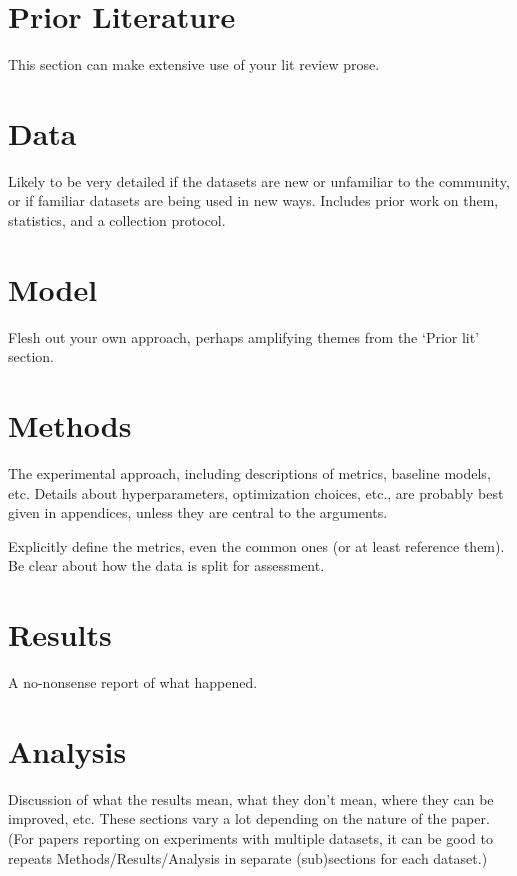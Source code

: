 \documentclass[10pt]{article}
\begin{document}
\section{Prior Literature}

This section can make extensive use of your lit review prose. \cite{Arora2017}

\section{Data}

Likely to be very detailed if the datasets are new or unfamiliar to the community, or if familiar datasets are being used in new ways.
Includes prior work on them, statistics, and a collection protocol. 

\section{Model}

Flesh out your own approach, perhaps amplifying themes from the `Prior lit' section.

\section{Methods}

The experimental approach, including descriptions of metrics, baseline models, etc. Details about hyperparameters, optimization choices, etc., are probably best given in appendices, unless they are central to the arguments.

Explicitly define the metrics, even the common ones (or at least reference them). Be clear about how the data is split for assessment. 

\section{Results} 

A no-nonsense report of what happened.

\section{Analysis} 

Discussion of what the results mean, what they don’t mean, where they can be improved, etc. These sections vary a lot depending on the nature of the paper. (For papers reporting on experiments with multiple datasets, it can be good to repeats Methods/Results/Analysis in separate (sub)sections for each dataset.)
\end{document}

